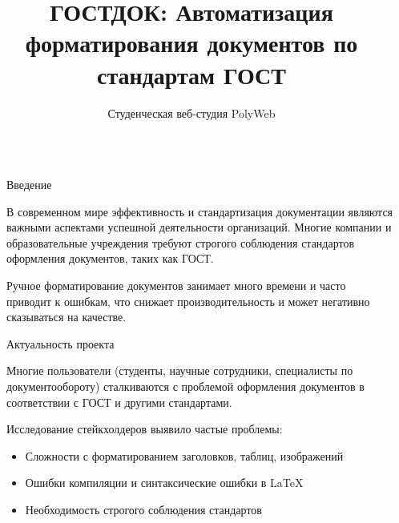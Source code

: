 \documentclass[final]{beamer}
\title{ГОСТДОК: Автоматизация форматирования документов по стандартам ГОСТ} %
\author{Студенческая веб-студия PolyWeb} %
\institute{ФГАОУ ВО «Московский политехнический университет»} %
\newlength{\sepwid}
\newlength{\onecolwid}
\begin{document}

\setlength{\belowcaptionskip}{2ex} %
\setlength\belowdisplayshortskip{2ex} %

\begin{frame}[t] %

\begin{columns}[t] %

\begin{column}{\sepwid}\end{column} %

\begin{column}{\onecolwid} %


\begin{block}{Введение}

В современном мире эффективность и стандартизация документации являются важными аспектами успешной деятельности организаций. Многие компании и образовательные учреждения требуют строгого соблюдения стандартов оформления документов, таких как ГОСТ.

Ручное форматирование документов занимает много времени и часто приводит к ошибкам, что снижает производительность и может негативно сказываться на качестве.

\end{block}


\begin{block}{Актуальность проекта}

Многие пользователи (студенты, научные сотрудники, специалисты по документообороту) сталкиваются с проблемой оформления документов в соответствии с ГОСТ и другими стандартами.

Исследование стейкхолдеров выявило частые проблемы:
\begin{itemize}
\item Сложности с форматированием заголовков, таблиц, изображений
\item Ошибки компиляции и синтаксические ошибки в LaTeX
\item Необходимость строгого соблюдения стандартов
\end{itemize}


\end{block}
\end{column}
\end{columns}
\end{frame}
\end{document}

